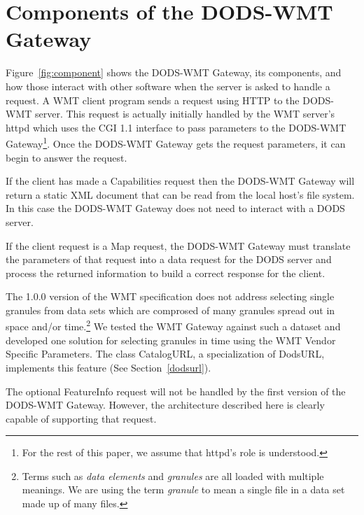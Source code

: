 \documentclass{article}
\begin{document}
\section{Components of the DODS-WMT Gateway}
\label{sec:components}

Figure~\ref{fig:component} shows the DODS-WMT Gateway, its components, and
how those interact with other software when the server is asked to handle a
request. A WMT client program sends a request using HTTP to the DODS-WMT
server. This request is actually initially handled by the WMT server's httpd
which uses the CGI 1.1 interface to pass parameters to the DODS-WMT
Gateway\footnote{For the rest of this paper, we assume that httpd's role is
  understood.}. Once the DODS-WMT Gateway gets the request parameters, it can
begin to answer the request.

If the client has made a Capabilities request then the DODS-WMT Gateway will
return a static XML document that can be read from the local host's file
system. In this case the DODS-WMT Gateway does not need to interact with a
DODS server.

If the client request is a Map request, the DODS-WMT Gateway must translate
the parameters of that request into a data request for the DODS server and
process the returned information to build a correct response for the client.

The 1.0.0 version of the WMT specification does not address selecting single
granules from data sets which are comprosed of many granules spread out in
space and/or time.\footnote{Terms such as \emph{data elements} and
  \emph{granules} are all loaded with multiple meanings. We are using the
  term \emph{granule} to mean a single file in a data set made up of many
  files.} We tested the WMT Gateway against such a dataset and developed one
solution for selecting granules in time using the WMT Vendor Specific
Parameters. The class CatalogURL, a specialization of DodsURL, implements
this feature (See Section~\ref{dodsurl}).

The optional FeatureInfo request will not be handled by the first version of
the DODS-WMT Gateway. However, the architecture described here is clearly
capable of supporting that request.

\begin{sidewaysfigure}
\begin{center}
\caption{A Combined Deployment and Component diagram for the DODS WMT Gateway.
  Only the DODS-WMT Gateway and Processing Modules components need to be
  built; the other components already exist.}
\label{fig:component}
\end{center}
\end{sidewaysfigure}
\end{document}
